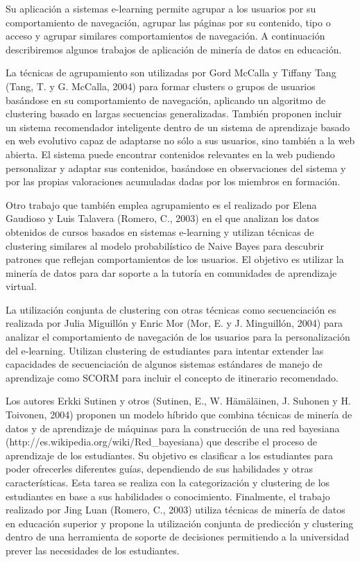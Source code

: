 Su aplicación a sistemas e-learning permite agrupar a los usuarios por su
comportamiento de navegación, agrupar las páginas por su contenido, tipo o
acceso y agrupar similares comportamientos de navegación. A continuación
describiremos algunos trabajos de aplicación de minería de datos en educación.

La técnicas de agrupamiento son utilizadas por Gord McCalla y Tiffany
Tang (Tang, T. y G. McCalla, 2004) para formar clusters o grupos de usuarios
basándose en su comportamiento de navegación, aplicando un algoritmo de
clustering basado en largas secuencias generalizadas. También proponen incluir
un sistema recomendador inteligente dentro de un sistema de aprendizaje
basado en web evolutivo capaz de adaptarse no sólo a sus usuarios, sino también
a la web abierta. El sistema puede encontrar contenidos relevantes en la
web pudiendo personalizar y adaptar sus contenidos, basándose en observaciones
del sistema y por las propias valoraciones acumuladas dadas por los
miembros en formación.

Otro trabajo que también emplea agrupamiento es el realizado por Elena
Gaudioso y Luis Talavera (Romero, C., 2003) en el que analizan los datos
obtenidos de cursos basados en sistemas e-learning y utilizan técnicas de
clustering similares al modelo probabilístico de Naive Bayes para descubrir
patrones que reflejan comportamientos de los usuarios. El objetivo es utilizar
la minería de datos para dar soporte a la tutoría en comunidades de aprendizaje
virtual.

La utilización conjunta de clustering con otras técnicas como secuenciación es
realizada por Julia Miguillón y Enric Mor (Mor, E. y J. Minguillón, 2004) para
analizar el comportamiento de navegación de los usuarios para la personalización
del e-learning. Utilizan clustering de estudiantes para intentar extender las
capacidades de secuenciación de algunos sistemas estándares de manejo
de aprendizaje como SCORM para incluir el concepto de itinerario recomendado.

Los autores Erkki Sutinen y otros (Sutinen, E., W. Hämäläinen, J. Suhonen y H.
Toivonen, 2004) proponen un modelo híbrido que combina técnicas de minería de
datos y de aprendizaje de máquinas para la construcción de una red bayesiana
(http://es.wikipedia.org/wiki/Red\_bayesiana) que describe el proceso
de aprendizaje de los estudiantes. Su objetivo es clasificar a los estudiantes
para poder ofrecerles diferentes guías, dependiendo de sus habilidades y otras
características. Esta tarea se realiza con la categorización y clustering de los
estudiantes en base a sus habilidades o conocimiento. Finalmente, el
trabajo realizado por Jing Luan (Romero, C., 2003) utiliza técnicas de minería
de datos en educación superior y propone la utilización conjunta de predicción
y clustering dentro de una herramienta de soporte de decisiones permitiendo a 
la universidad prever las necesidades de los estudiantes.

